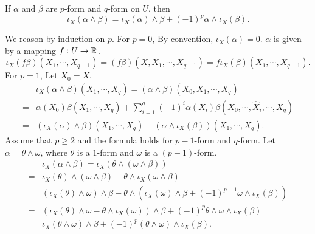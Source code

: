 \begin{propositionenv}
    If $\alpha$ and $\beta$ are $p$-form and $q$-form on $U$, then
    $$\iota_{X}(\alpha \wedge \beta) = \iota_{X}(\alpha) \wedge \beta + (-1)^{p}\alpha \wedge \iota_{X}(\beta).$$
\end{propositionenv}
\begin{proofenv}
    We reason by induction on $p$.
    For $p=0$, By convention, $\iota_{X}(\alpha) = 0$.
    $\alpha$ is given by a mapping $f : U \rightarrow \mathbb{R}$.
    $$\iota_{X}(f \beta)(X_1,\cdots,X_{q-1})
    = (f \beta)(X,X_1,\cdots,X_{q-1})
    = f \iota_{X}(\beta)(X_1,\cdots,X_{q-1}).$$
    For $p=1$, Let $X_0 = X$.
    $$\begin{aligned}
        & \iota_{X}(\alpha \wedge \beta)(X_1,\cdots,X_{q}) = (\alpha \wedge \beta)(X_0,X_1,\cdots,X_{q})\\
        = & \alpha(X_0) \beta(X_1,\cdots,X_{q}) + \sum_{i=1}^{q} (-1)^i \alpha(X_i) \beta(X_0,\cdots,\hat{X}_i,\cdots,X_{q})\\
        = & (\iota_{X}(\alpha) \wedge \beta)(X_1,\cdots,X_{q}) - (\alpha \wedge \iota_{X}(\beta))(X_1,\cdots,X_{q}).
    \end{aligned}$$
    Assume that $p\ge 2$ and the formula holds for $p-1$-form and $q$-form.
    Let $\alpha = \theta \wedge \omega$, where $\theta$ is a $1$-form and $\omega$ is a $(p-1)$-form.
    $$\begin{aligned}
        & \iota_{X}(\alpha \wedge \beta) = \iota_{X}\left(\theta \wedge (\omega \wedge \beta)\right)\\
        = & \iota_{X}(\theta) \wedge (\omega \wedge \beta) - \theta \wedge \iota_{X}(\omega \wedge \beta)\\
        = & (\iota_{X}(\theta) \wedge \omega) \wedge \beta - \theta \wedge (\iota_{X}(\omega) \wedge \beta + (-1)^{p - 1} \omega \wedge \iota_{X}(\beta))\\
        = & \left(\iota_{X}(\theta) \wedge \omega - \theta \wedge \iota_{X}(\omega)\right) \wedge \beta + (-1)^{p}\theta \wedge \omega \wedge \iota_{X}(\beta)\\
        = & \iota_{X}(\theta \wedge \omega) \wedge \beta + (-1)^{p} (\theta \wedge \omega) \wedge \iota_{X}(\beta).
    \end{aligned}$$
\end{proofenv}

